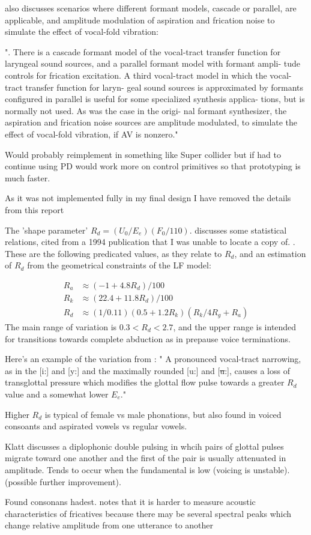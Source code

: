 \cite{Klatt1990} also discusses scenarios where different formant models, cascade or parallel, are applicable, and amplitude modulation of aspiration and frication noise to simulate the effect of vocal-fold vibration:

".
There is a cascade formant model
of the vocal-tract transfer function for laryngeal sound sources,
and a parallel formant model with formant ampli-
tude controls for frication excitation.
A third vocal-tract
model in which the vocal-tract transfer function for laryn- geal sound sources
is approximated by formants
configured
in parallel is useful for some specialized
synthesis
applica-
tions, but is normally not used.
As was the case in the origi-
nal formant synthesizer,
the aspiration and frication noise
sources are amplitude modulated, to simulate the effect of vocal-fold vibration, if AV is nonzero."

Would probably reimplement in something like Super collider but if had to continue using PD would work more on control primitives so that prototyping is much faster.

As it was not implemented fully in my final design I have removed the details from this report 

The 'shape parameter' $R_d = (U_0/E_e)(F_0/110)$.  \cite{Fant1995} discusses some statistical relations, cited from  a 1994 publication that I was unable to locate a copy of. \cite{Fant1994}. These are the following predicated values, as they relate to $R_d$, and an estimation of $R_d$ from the geometrical constraints of the LF model:

\begin{align}
R_a & \approx (-1+4.8R_d)/100 \\
R_k  & \approx (22.4 + 11.8R_d)/100 \\
R_d & \approx (1/0.11)(0.5+1.2R_k)(R_k/4R_g+R_a)
\end{align}
The main range of variation is $0.3 < R_d < 2.7$, and the upper range is intended for transitions towards complete abduction as in prepause voice terminations.

Here's an example of the variation from \cite{Fant1995}: "
A pronounced vocal-tract narrowing, as in the [i:] and [y:] and the maximally rounded [u:] and [\sout{u}:], causes a loss of transglottal pressure which modifies the glottal flow pulse towards a greater $R_d$ value and a somewhat lower $E_e$."

Higher $R_d$ is typical of female vs male phonations, but also found in voiced consoants and aspirated vowels vs regular vowels. \cite{Fant1995}

Klatt \cite{Klatt1990} discusses a diplophonic double pulsing in whcih pairs of glottal pulses migrate toward one another and the first of the pair is usually attenuated in amplitude. Tends to occur when the fundamental is low (voicing is unstable). (possible further improvement).

Found consonans hadest. \cite{Johnson2003} notes that it is harder to measure acoustic characteristics of fricatives because there may be several spectral peaks which change relative amplitude from one utterance to another


